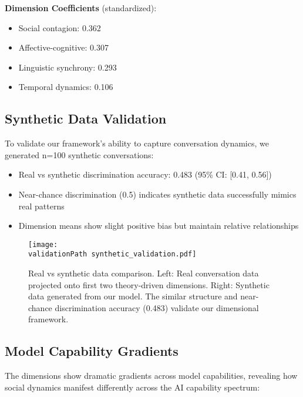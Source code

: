 \documentclass[11pt,letterpaper]{article}
\newcommand{\socialContagionCoef}{0.362}
\newcommand{\affectiveCognitiveCoef}{0.307}
\newcommand{\linguisticSynchronyCoef}{0.293}
\newcommand{\temporalDynamicsCoef}{0.106}
\newcommand{\syntheticDiscriminationAccuracy}{0.483}
\newcommand{\syntheticDiscriminationCI}{[0.41, 0.56]}
\newcommand{\validationPath}{../analysis/rigorous_analysis_outputs/validation/}
\begin{document}
\textbf{Dimension Coefficients} (standardized):
\begin{itemize}
    \item Social contagion: \socialContagionCoef{}
    \item Affective-cognitive: \affectiveCognitiveCoef{}
    \item Linguistic synchrony: \linguisticSynchronyCoef{}
    \item Temporal dynamics: \temporalDynamicsCoef{}
\end{itemize}

\subsection{Synthetic Data Validation}

To validate our framework's ability to capture conversation dynamics, we generated n=100 synthetic conversations:

\begin{itemize}
    \item Real vs synthetic discrimination accuracy: \syntheticDiscriminationAccuracy{} (95\% CI: \syntheticDiscriminationCI{})
    \item Near-chance discrimination (0.5) indicates synthetic data successfully mimics real patterns
    \item Dimension means show slight positive bias but maintain relative relationships
\end{itemize}

\begin{figure}[htbp]
\centering
\texttt{[image: \\validationPath synthetic\_validation.pdf]}
\caption{Real vs synthetic data comparison. Left: Real conversation data projected onto first two theory-driven dimensions. Right: Synthetic data generated from our model. The similar structure and near-chance discrimination accuracy (\syntheticDiscriminationAccuracy{}) validate our dimensional framework.}
\label{fig:synthetic_validation}
\end{figure}

\subsection{Model Capability Gradients}

The dimensions show dramatic gradients across model capabilities, revealing how social dynamics manifest differently across the AI capability spectrum:
\end{document}
